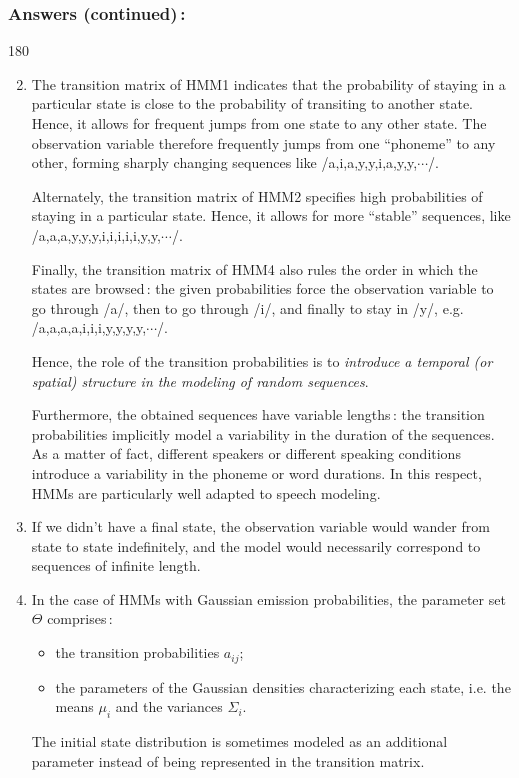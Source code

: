\documentclass[twoside,a4paper,titlepage]{article}
\newcommand{\expl}[1]{%
\begin{turn}{180}%
\parbox{\textwidth}{\em #1}%
\end{turn}%
}
\newcommand{\tab}{\hspace{1em}}
\begin{document}
\subsubsection*{Answers (continued)\,:}
\expl{
\begin{enumerate}
\setcounter{enumi}{1}
\item The transition matrix of HMM1 indicates that the probability of
staying in a particular state is close to the probability of transiting to
another state. Hence, it allows for frequent jumps from one state to any
other state. The observation variable therefore frequently jumps from one
``phoneme'' to any other, forming sharply changing sequences like
/a,i,a,y,y,i,a,y,y,$\cdots$/.

\tab Alternately, the transition matrix of HMM2 specifies high
probabilities of staying in a particular state. Hence, it allows for more
``stable'' sequences, like /a,a,a,y,y,y,i,i,i,i,i,y,y,$\cdots$/.

\tab Finally, the transition matrix of HMM4 also rules the order in which
the states are browsed\,: the given probabilities force the observation
variable to go through /a/, then to go through /i/, and finally to stay in
/y/, e.g. /a,a,a,a,i,i,i,y,y,y,y,$\cdots$/.

\tab Hence, the role of the transition probabilities is to {\em introduce a
temporal (or spatial) structure in the modeling of random sequences}.

\tab Furthermore, the obtained sequences have variable lengths\,: the
transition probabilities implicitly model a variability in the duration of
the sequences. As a matter of fact, different speakers or different
speaking conditions introduce a variability in the phoneme or word
durations. In this respect, HMMs are particularly well adapted to speech
modeling.

\item If we didn't have a final state, the observation variable would
wander from state to state indefinitely, and the model would necessarily
correspond to sequences of infinite length.

\item In the case of HMMs with Gaussian emission probabilities, the
parameter set $\Theta$ comprises\,:
\begin{itemize}
\item the transition probabilities $a_{ij}$;
\item the parameters of the Gaussian densities characterizing each state,
i.e. the means $\mu_i$ and the variances $\Sigma_i$.
\end{itemize}
The initial state distribution is sometimes modeled as an additional
parameter instead of being represented in the transition matrix.


\end{enumerate}}
\end{document}
